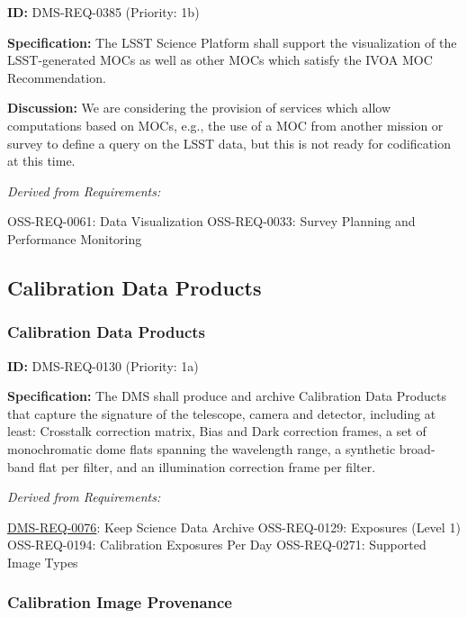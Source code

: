 \documentclass[SE,toc,lsstdraft]{lsstdoc}
\begin{document}
\label{DMS-REQ-0385}
\textbf{ID:} DMS-REQ-0385 (Priority: 1b)

\textbf{Specification:}
The LSST Science Platform shall support the visualization of the LSST-generated MOCs as well as other MOCs which satisfy the IVOA MOC Recommendation.

\textbf{Discussion:}
We are considering the provision of services which allow computations based on MOCs, e.g., the use of a MOC from another mission or survey to define a query on the LSST data, but this is not ready for codification at this time.

\emph{Derived from Requirements:}

OSS-REQ-0061:
Data Visualization \newline
OSS-REQ-0033:
Survey Planning and Performance Monitoring \newline

\subsection{Calibration Data Products}

\subsubsection{Calibration Data Products}

\label{DMS-REQ-0130}
\textbf{ID:} DMS-REQ-0130 (Priority: 1a)

\textbf{Specification:} The DMS shall produce and archive Calibration Data Products that capture the signature of the telescope, camera and detector, including at least: Crosstalk correction matrix, Bias and Dark correction frames, a set of monochromatic dome flats spanning the wavelength range, a synthetic broad-band flat per filter, and an illumination correction frame per filter.

\emph{Derived from Requirements:}

\hyperref[DMS-REQ-0076]{DMS-REQ-0076}:
Keep Science Data Archive \newline
OSS-REQ-0129:
Exposures (Level 1) \newline
OSS-REQ-0194:
Calibration Exposures Per Day \newline
OSS-REQ-0271:
Supported Image Types \newline

\subsubsection{Calibration Image Provenance}
\end{document}
